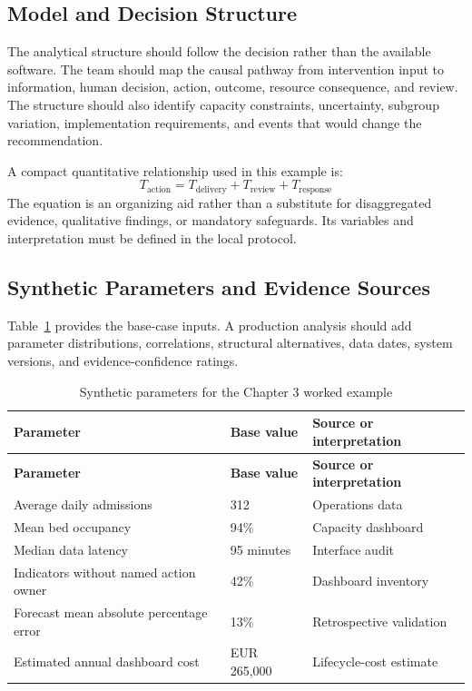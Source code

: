 \subsection{Model and Decision Structure}
The analytical structure should follow the decision rather than the available
software. The team should map the causal pathway from intervention input to
information, human decision, action, outcome, resource consequence, and review.
The structure should also identify capacity constraints, uncertainty, subgroup
variation, implementation requirements, and events that would change the
recommendation.

A compact quantitative relationship used in this example is:
\begin{equation}
T_{\mathrm{action}}=T_{\mathrm{delivery}}+T_{\mathrm{review}}+T_{\mathrm{response}}
\label{eq:comp-ch03-key-relationship}
\end{equation}
The equation is an organizing aid rather than a substitute for disaggregated evidence,
qualitative findings, or mandatory safeguards. Its variables and interpretation must
be defined in the local protocol.

\subsection{Synthetic Parameters and Evidence Sources}
Table~\ref{tab:comp-ch03-parameters} provides the base-case inputs. A
production analysis should add parameter distributions, correlations, structural
alternatives, data dates, system versions, and evidence-confidence ratings.

\begin{longtable}{@{}p{}p{}p{}@{}}
\caption{Synthetic parameters for the Chapter 3 worked example}
\label{tab:comp-ch03-parameters}\\
\toprule
\textbf{Parameter} & \textbf{Base value} & \textbf{Source or interpretation} \\
\midrule
\endfirsthead
\toprule
\textbf{Parameter} & \textbf{Base value} & \textbf{Source or interpretation} \\
\midrule
\endhead
\bottomrule
\endlastfoot
Average daily admissions & 312 & Operations data \\
Mean bed occupancy & 94\% & Capacity dashboard \\
Median data latency & 95 minutes & Interface audit \\
Indicators without named action owner & 42\% & Dashboard inventory \\
Forecast mean absolute percentage error & 13\% & Retrospective validation \\
Estimated annual dashboard cost & EUR 265,000 & Lifecycle-cost estimate \\
\end{longtable}

